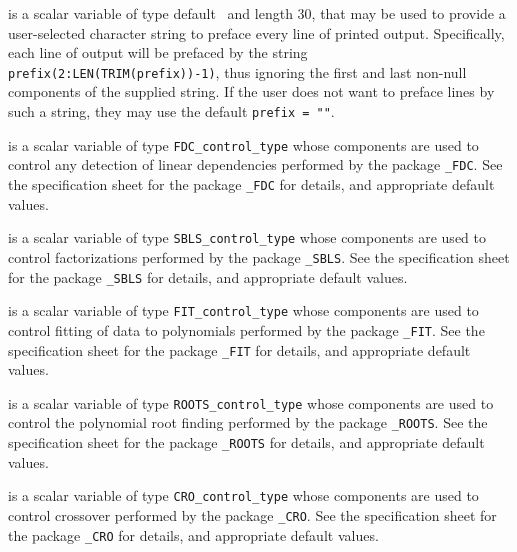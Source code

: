 \begin{description}
 is a scalar variable of type default \character\
and length 30, that may be used to provide a user-selected
character string to preface every line of printed output.
Specifically, each line of output will be prefaced by the string
{\tt prefix(2:LEN(TRIM(prefix))-1)},
thus ignoring the first and last non-null components of the
supplied string. If the user does not want to preface lines by such
a string, they may use the default {\tt prefix = ""}.

 is a scalar variable of type
{\tt FDC\_control\_type}
whose components are used to control any detection of linear dependencies
performed by the package
{\tt \libraryname\_FDC}.
See the specification sheet for the package
{\tt \libraryname\_FDC}
for details, and appropriate default values.

 is a scalar variable of type
{\tt SBLS\_control\_type}
whose components are used to control factorizations
performed by the package
{\tt \libraryname\_SBLS}.
See the specification sheet for the package
{\tt \libraryname\_SBLS}
for details, and appropriate default values.

 is a scalar variable of type
{\tt FIT\_control\_type}
whose components are used to control fitting of data to polynomials
performed by the package
{\tt \libraryname\_FIT}.
See the specification sheet for the package
{\tt \libraryname\_FIT}
for details, and appropriate default values.

 is a scalar variable of type
{\tt ROOTS\_control\_type}
whose components are used to control the polynomial root finding
performed by the package
{\tt \libraryname\_ROOTS}.
See the specification sheet for the package
{\tt \libraryname\_ROOTS}
for details, and appropriate default values.

 is a scalar variable of type
{\tt CRO\_control\_type}
whose components are used to control crossover
performed by the package
{\tt \libraryname\_CRO}.
See the specification sheet for the package
{\tt \libraryname\_CRO}
for details, and appropriate default values.

\end{description}
